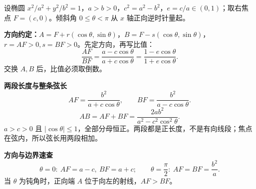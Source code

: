 \begin{statementbox}
设椭圆 $x^2/a^2+y^2/b^2=1$，$a>b>0$，$c^2=a^2-b^2$，$e=c/a\in(0,1)$；取右焦点 $F=(c,0)$。倾斜角 $0\le\theta<\pi$ 从 $x$ 轴正向逆时针量起。
\begin{center}\end{center}
\textbf{方向约定：}$A=F+r(\cos\theta,\sin\theta)$，$B=F-s(\cos\theta,\sin\theta)$，$r=AF>0,s=BF>0$。先定方向，再写比值：
\[
 \boxed{\frac{AF}{BF}=\frac{a-c\cos\theta}{a+c\cos\theta}=\frac{1-e\cos\theta}{1+e\cos\theta}}.
\]
交换 $A,B$ 后，比值必须取倒数。
\end{statementbox}\clearpage\begin{statementbox}
\textbf{两段长度与整条弦长}
\[
 \boxed{AF=\frac{b^2}{a+c\cos\theta}},\qquad
 \boxed{BF=\frac{b^2}{a-c\cos\theta}}.
\]
\[
 \boxed{AB=AF+BF=\frac{2ab^2}{a^2-c^2\cos^2\theta}}.
\]
$a>c>0$ 且 $|\cos\theta|\le1$，全部分母恒正。两段都是正长度，不是有向线段；焦点在弦内，所以弦长用两段相加。

\medskip
\textbf{方向与边界速查}
\[
 \theta=0:\ AF=a-c,\ BF=a+c;\qquad
 \theta=\frac\pi2:\ AF=BF=\frac{b^2}{a}.
\]
当 $\theta$ 为钝角时，正向端 $A$ 位于向左的射线，$AF>BF$。

\end{statementbox}
